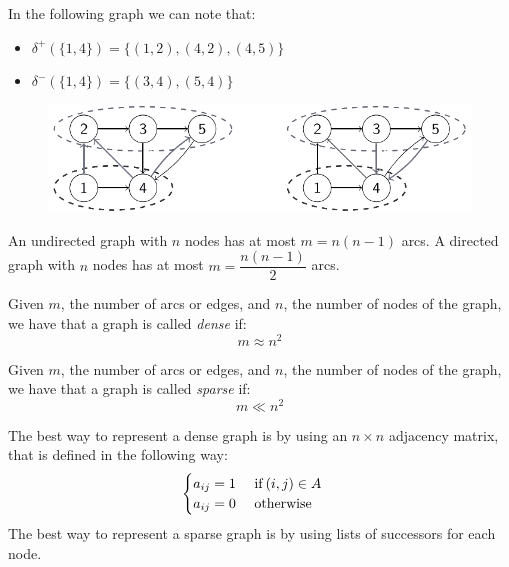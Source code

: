 \documentclass[12pt, a4paper]{report}
\begin{document}
    \begin{example}
        In the following graph we can note that: 
        \begin{itemize}
            \item $\delta^{+}(\{1,4\})=\{(1,2),(4,2),(4,5)\}$
            \item $\delta^{-}(\{1,4\})=\{(3,4),(5,4)\}$
        \end{itemize}
        \begin{figure}[H]
            \centering
            \includegraphics[width=0.75\linewidth]{images/cuts.png}
        \end{figure}
    \end{example}
    An undirected graph with $n$ nodes has at most $m=n(n-1)$ arcs. 
    A directed graph with $n$ nodes has at most $m=\dfrac{n(n-1)}{2}$ arcs.
    \begin{definition}
        Given $m$, the number of arcs or edges, and $n$, the number of nodes of the graph, we have that a graph is called \emph{dense} if:
        \[m \approx n^2\]

        Given $m$, the number of arcs or edges, and $n$, the number of nodes of the graph, we have that a graph is called \emph{sparse} if:
        \[m \ll n^2\]
    \end{definition}
    The best way to represent a dense graph is by using an $n \times n$ adjacency matrix, that is defined in the following way: 
    \[
    \begin{cases}
        a_{ij}=1 \:\:\:\:\:\: \textnormal{if}\:(i,j) \in A \\
        a_{ij}=0 \:\:\:\:\:\: \textnormal{otherwise}    
    \end{cases}    
    \]
    The best way to represent a sparse graph is by using lists of successors for each node. 
\end{document}
